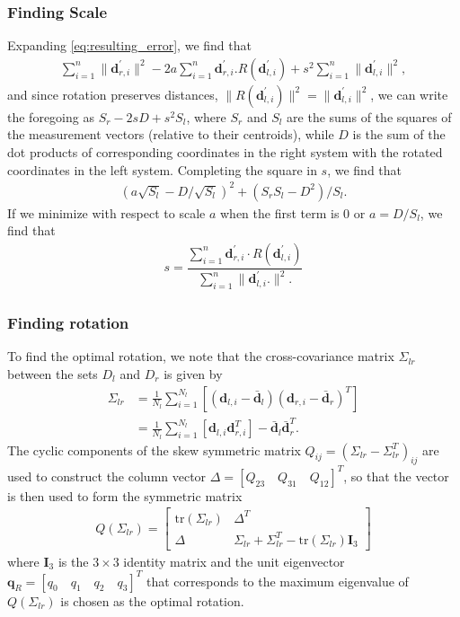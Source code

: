 \subsubsection{Finding Scale}
%
Expanding \eqref{eq:resulting_error}, we find that 
%
\begin{align}
	\sum_{i=1}^{n} \|\bm{d}^\prime_{r,i}\|^2 - 2 a \sum_{i=1}^{n} \bm{d}^\prime_{r,i} . R(\bm{d}^\prime_{l,i}) + s^2 	\sum_{i=1}^{n} \|\bm{d}^\prime_{l,i}\|^2,
\end{align}
%
and since rotation preserves distances, $\| R(\bm{d}^\prime_{l,i}) \|^2 = \|\bm{d}^\prime_{l,i}\|^2$, we can write the foregoing as $S_r - 2sD + s^2 S_l$, where $S_r$ and $S_l$ are the sums of the squares of the measurement vectors (relative to their centroids), while $D$ is the sum of the dot products of corresponding coordinates in the right system with the rotated coordinates in the left system. Completing the square in $s$, we find that 
%
\begin{align}
	\left(a \sqrt{S_l} - D/\sqrt{S_l}\right)^2 + \left(S_r S_l - D^2\right)/S_l.
\end{align}
%
If we minimize with respect to scale $a$ when the first term is $0$ or $a = D/S_l$, we find that 
%
\begin{align}
	s = \dfrac{\sum_{i=1}^{n} \bm{d}^\prime_{r,i} \cdot R(\bm{d}^\prime_{l,i})}{\sum_{i=1}^n \|\bm{d}^\prime_{l,i}. \|^2.}
\end{align}

\subsubsection{Finding rotation}
To find the optimal rotation, we note that the cross-covariance matrix $\Sigma_{lr}$ between the sets $D_l$ and $D_r$ is given by 
%
\begin{align}
	\Sigma_{lr} &= \frac{1}{N_l} \sum_{i=1}^{N_l}\left[(\bm{d}_{l,i} - \bar{\bm{d}}_l)(\bm{d}_{r,i} - \bar{\bm{d}}_r)^T\right] \\
	&= \frac{1}{N_l} \sum_{i=1}^{N_l} \left[\bm{d}_{l,i} \bm{d}_{r,i}^T\right] - \bar{\bm{d}}_l \bar{\bm{d}}_r^T.
\end{align}
%
The cyclic components of the skew symmetric matrix $Q_{ij} = \left(\Sigma_{lr} - \Sigma_{lr}^T\right)_{ij}$ are used to construct the column vector $\Delta = \left[Q_{23} \quad Q_{31} \quad Q_{12}\right]^T$, so that the vector is then used to form the symmetric matrix
%
\begin{align}
	Q(\Sigma_{lr}) = \begin{bmatrix}
	\text{tr}(\Sigma_{lr}) & \Delta^T \\
	\Delta & \Sigma_{lr} + \Sigma_{lr}^T - \text{tr}(\Sigma_{lr}) \bm{I}_3
	\end{bmatrix}
\end{align}
%
where $\bm{I}_3$ is the $3\times3$ identity matrix and the unit eigenvector $\bm{q}_R = \left[q_0 \quad q_1 \quad q_2 \quad q_3\right]^T$ that corresponds to the maximum eigenvalue of $	Q(\Sigma_{lr})$ is chosen as the optimal rotation.

